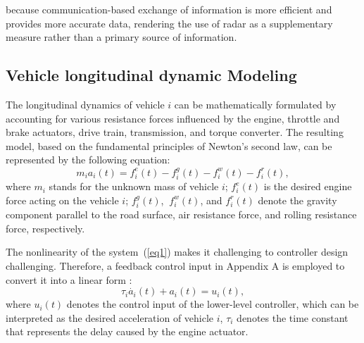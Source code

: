 \documentclass[journal]{IEEEtran}
\begin{document}
because communication-based exchange of information is more efficient and provides more accurate data, rendering the use of radar as a supplementary measure rather than a primary source of information.


\subsection{Vehicle longitudinal dynamic Modeling}
\label{Section 3.1}

The longitudinal dynamics of vehicle $i$ can be mathematically formulated by accounting for various resistance forces influenced by the engine, throttle and brake actuators, drive train, transmission, and torque converter. The resulting model, based on the fundamental principles of Newton's second law, can be represented by the following equation:
\begin{equation}
  m_ia_i(t)=f_i^e(t)-f_i^g(t)-f_i^w(t)-f_i^r(t),
  \label{eq1}
\end{equation}
where $m_i$ stands for the unknown mass of vehicle $i$; $f_i^e(t)$ is the desired engine force acting on the vehicle $i$; $f_i^g(t)$, $\ f_i^w(t)$, and $f_i^r(t)$ denote the gravity component parallel to the road surface, air resistance force, and rolling resistance force, respectively.

The nonlinearity of the system~(\ref{eq1}) makes it challenging to controller design challenging. Therefore, a feedback control input in Appendix A is employed to convert it into a linear form \citep{Wang2018}:
\begin{equation}
  \tau_i\dot{a_i}\left(t\right)+a_i\left(t\right)=u_i(t),
  \label{eq2}
\end{equation}
where $u_i(t)$ denotes the control input of the lower-level controller, which can be interpreted as the desired acceleration of vehicle $i$, $\tau_i$ denotes the time constant that represents the delay caused by the engine actuator.
\end{document}
